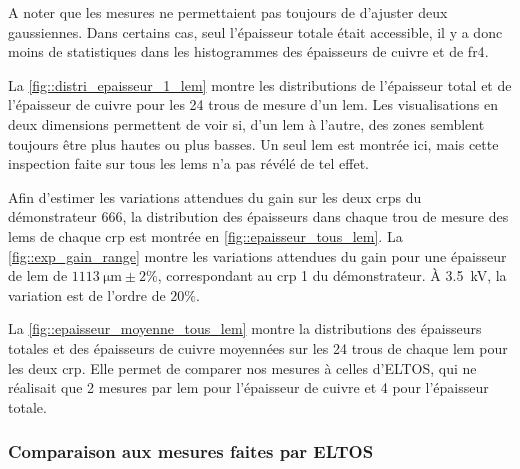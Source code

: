                 A noter que les mesures ne permettaient pas toujours de d'ajuster deux gaussiennes. Dans certains cas, seul l'épaisseur totale était accessible, il y a donc moins de statistiques dans les histogrammes des épaisseurs de cuivre et de \gls{fr4}.
                
                La \autoref{fig::distri_epaisseur_1_lem} montre les distributions de l'épaisseur total et de l'épaisseur de cuivre pour les 24 trous de mesure d'un \gls{lem}. Les visualisations en deux dimensions permettent de voir si, d'un \gls{lem} à l'autre, des zones semblent toujours être plus hautes ou plus basses. Un seul \gls{lem} est montrée ici, mais cette inspection faite sur tous les \glspl{lem} n'a pas révélé de tel effet.
                
                Afin d'estimer les variations attendues du gain sur les deux \glspl{crp} du démonstrateur 666, la distribution des épaisseurs dans chaque trou de mesure des \glspl{lem} de chaque \gls{crp} est montrée en \autoref{fig::epaisseur_tous_lem}. La \autoref{fig::exp_gain_range} montre les variations attendues du gain pour une épaisseur de \gls{lem} de $\SI{1113}{\micro\meter}\pm2\%$, correspondant au \gls{crp} 1 du démonstrateur. À \SI{3.5}{\kilo\volt}, la variation est de l'ordre de $20\%$.
                
                La \autoref{fig::epaisseur_moyenne_tous_lem} montre la distributions des épaisseurs totales et des épaisseurs de cuivre moyennées sur les 24 trous de chaque \gls{lem} pour les deux \gls{crp}. Elle permet de comparer nos mesures à celles d'ELTOS, qui ne réalisait que 2 mesures par \gls{lem} pour l'épaisseur de cuivre et 4 pour l'épaisseur totale. 
                
            \subsubsection{Comparaison aux mesures faites par ELTOS}\label{sec::thickness_comparison_eltos}
            
